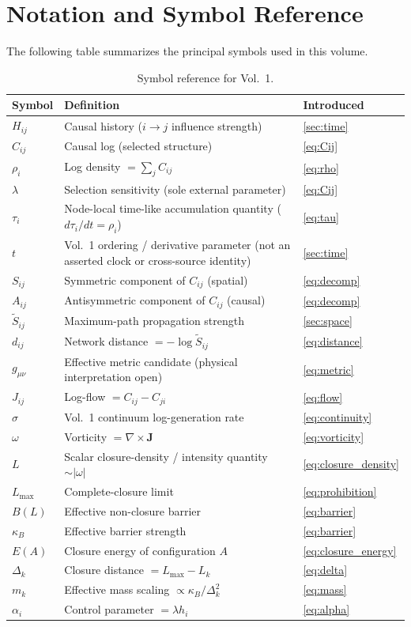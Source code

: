\section{Notation and Symbol Reference}
\label{app:notation}

The following table summarizes the principal symbols used in this volume.

\begin{table}[h]
\centering
\begin{tabular}{lll}
\toprule
Symbol & Definition & Introduced \\
\midrule
$H_{ij}$ & Causal history ($i \to j$ influence strength) & \cref{sec:time} \\
$C_{ij}$ & Causal log (selected structure) & \cref{eq:Cij} \\
$\rho_i$ & Log density $= \sum_j C_{ij}$ & \cref{eq:rho} \\
$\lambda$ & Selection sensitivity (sole external parameter) & \cref{eq:Cij} \\
$\tau_i$ & Node-local time-like accumulation quantity ($d\tau_i/dt = \rho_i$) & \cref{eq:tau} \\
$t$ & Vol.~1 ordering / derivative parameter (not an asserted clock or cross-source identity) & \cref{sec:time} \\
$S_{ij}$ & Symmetric component of $C_{ij}$ (spatial) & \cref{eq:decomp} \\
$A_{ij}$ & Antisymmetric component of $C_{ij}$ (causal) & \cref{eq:decomp} \\
$\tilde{S}_{ij}$ & Maximum-path propagation strength & \cref{sec:space} \\
$d_{ij}$ & Network distance $= -\log\tilde{S}_{ij}$ & \cref{eq:distance} \\
$g_{\mu\nu}$ & Effective metric candidate (physical interpretation open) & \cref{eq:metric} \\
$J_{ij}$ & Log-flow $= C_{ij} - C_{ji}$ & \cref{eq:flow} \\
$\sigma$ & Vol.~1 continuum log-generation rate & \cref{eq:continuity} \\
$\omega$ & Vorticity $= \nabla \times \mathbf{J}$ & \cref{eq:vorticity} \\
$L$ & Scalar closure-density / intensity quantity $\sim |\omega|$ & \cref{eq:closure_density} \\
$L_{\max}$ & Complete-closure limit & \cref{eq:prohibition} \\
$B(L)$ & Effective non-closure barrier & \cref{eq:barrier} \\
$\kappa_B$ & Effective barrier strength & \cref{eq:barrier} \\
$E(A)$ & Closure energy of configuration $A$ & \cref{eq:closure_energy} \\
$\Delta_k$ & Closure distance $= L_{\max} - L_k$ & \cref{eq:delta} \\
$m_k$ & Effective mass scaling $\propto \kappa_B / \Delta_k^2$ & \cref{eq:mass} \\
$\alpha_i$ & Control parameter $= \lambda h_i$ & \cref{eq:alpha} \\
\bottomrule
\end{tabular}
\caption{Symbol reference for Vol.~1.}
\label{tab:notation}
\end{table}
